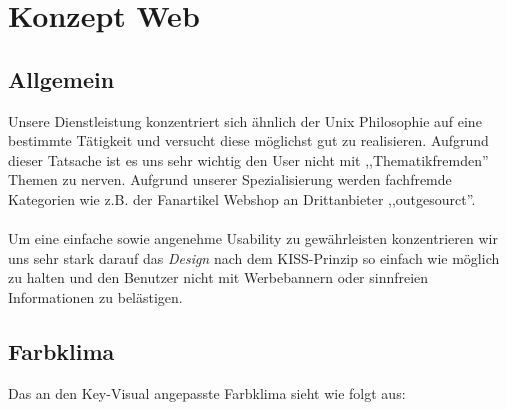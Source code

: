 \chapter{Konzept Web}

\label{konzept_web}
\section{Allgemein}

Unsere Dienstleistung konzentriert sich ähnlich der Unix Philosophie auf eine
bestimmte Tätigkeit und versucht diese möglichst gut zu realisieren. Aufgrund
dieser Tatsache ist es uns sehr wichtig den User nicht mit ,,Thematikfremden''
Themen zu nerven. Aufgrund unserer Spezialisierung werden fachfremde Kategorien
wie z.B. der Fanartikel Webshop an Drittanbieter ,,outgesourct''.
\\
\\
Um eine einfache sowie angenehme Usability zu gewährleisten konzentrieren wir
uns sehr stark darauf das \emph{Design} nach dem KISS-Prinzip so einfach wie
möglich zu halten und den Benutzer nicht mit Werbebannern oder sinnfreien
Informationen zu belästigen.

\newpage

\section{Farbklima}
Das an den Key-Visual angepasste Farbklima sieht wie folgt aus:

